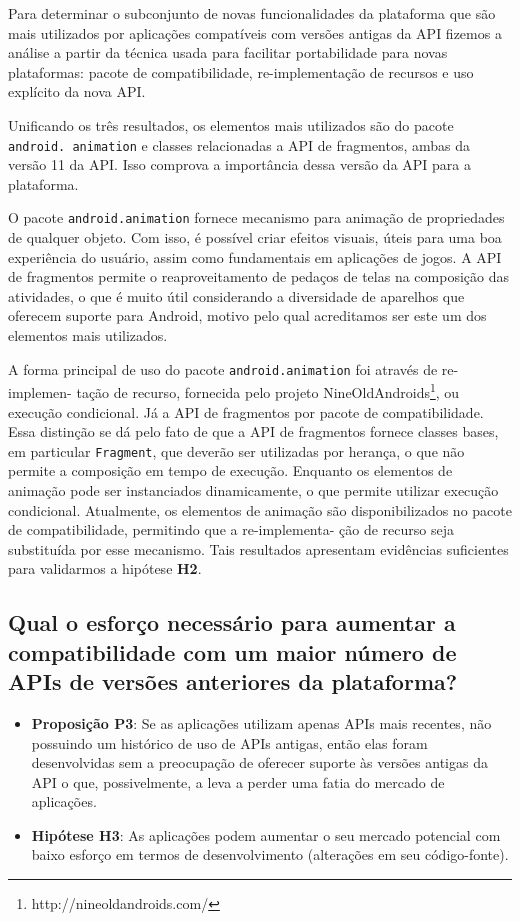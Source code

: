 Para determinar o subconjunto de novas funcionalidades da plataforma que são mais
utilizados por aplicações compatíveis com versões antigas da API fizemos a análise
a partir da técnica usada para facilitar portabilidade para novas plataformas: pacote
de compatibilidade, re-implementação de recursos e uso explícito da nova API.

Unificando os três resultados,  os elementos mais utilizados são do pacote
\texttt{android. animation} e classes relacionadas a API de fragmentos, ambas
da versão 11 da API. Isso comprova a importância dessa versão da API para a
plataforma. 

O pacote \texttt{android.animation} fornece mecanismo para animação de propriedades
de qualquer objeto. Com isso, é possível criar efeitos visuais, úteis para uma boa
experiência do usuário, assim como fundamentais em aplicações de jogos. A API de
fragmentos permite o reaproveitamento de pedaços de telas na composição das atividades,
o que é muito útil considerando a diversidade de aparelhos que oferecem suporte para
Android, motivo pelo qual acreditamos ser este um dos elementos mais utilizados. 

A forma principal de uso do pacote \texttt{android.animation} foi através de
re-implemen- tação de recurso, fornecida pelo projeto NineOldAndroids\footnote{http://nineoldandroids.com/},
ou execução condicional. Já a API de fragmentos por pacote de compatibilidade.
Essa distinção se dá pelo fato de que a API de fragmentos fornece classes bases,
em particular \texttt{Fragment}, que deverão ser utilizadas por herança, o que não
permite a composição em tempo de execução. Enquanto os elementos de animação pode
ser instanciados dinamicamente, o que permite utilizar execução condicional.
Atualmente, os elementos de animação são disponibilizados no pacote de compatibilidade,
permitindo que a re-implementa- ção de recurso seja substituída por esse mecanismo.
Tais resultados apresentam evidências suficientes para validarmos a hipótese \textbf{H2}.

\subsection{Qual o esforço necessário para aumentar a compatibilidade com um maior
número de APIs de versões anteriores da plataforma?} \label{subsec:esforco}

\begin{itemize}
	\item \textbf{Proposição P3}: Se as aplicações utilizam apenas APIs mais recentes,
	não possuindo um histórico de uso de APIs antigas, então elas foram desenvolvidas
	sem a preocupação de oferecer suporte às versões antigas da API o que, possivelmente,
	a leva a perder uma fatia do mercado de aplicações.
	\item \textbf{Hipótese H3}: As aplicações podem aumentar o seu mercado potencial com
	baixo esforço em termos de desenvolvimento (alterações em seu código-fonte).
\end{itemize}

